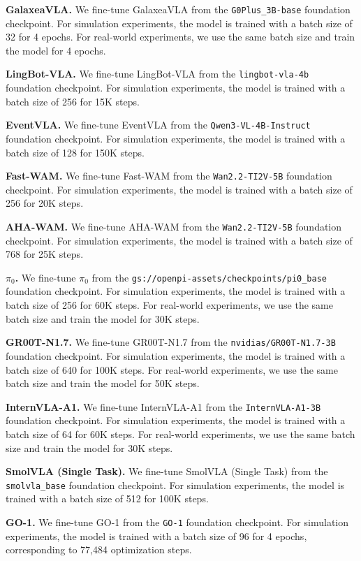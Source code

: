 \textbf{GalaxeaVLA.}
We fine-tune GalaxeaVLA from the \texttt{G0Plus\_3B-base} foundation checkpoint.
For simulation experiments, the model is trained with a batch size of 32 for 4 epochs.
For real-world experiments, we use the same batch size and train the model for 4 epochs.

\textbf{LingBot-VLA.}
We fine-tune LingBot-VLA from the \texttt{lingbot-vla-4b} foundation checkpoint.
For simulation experiments, the model is trained with a batch size of 256 for 15K steps.

\textbf{EventVLA.}
We fine-tune EventVLA from the \texttt{Qwen3-VL-4B-Instruct} foundation checkpoint.
For simulation experiments, the model is trained with a batch size of 128 for 150K steps.

\textbf{Fast-WAM.}
We fine-tune Fast-WAM from the \texttt{Wan2.2-TI2V-5B} foundation checkpoint.
For simulation experiments, the model is trained with a batch size of 256 for 20K steps.

\textbf{AHA-WAM.}
We fine-tune AHA-WAM from the \texttt{Wan2.2-TI2V-5B} foundation checkpoint.
For simulation experiments, the model is trained with a batch size of 768 for 25K steps.

\textbf{$\pi_0$.}
We fine-tune $\pi_0$ from the \texttt{gs://openpi-assets/checkpoints/pi0\_base} foundation checkpoint.
For simulation experiments, the model is trained with a batch size of 256 for 60K steps.
For real-world experiments, we use the same batch size and train the model for 30K steps.

\textbf{GR00T-N1.7.}
We fine-tune GR00T-N1.7 from the \texttt{nvidias/GR00T-N1.7-3B} foundation checkpoint.
For simulation experiments, the model is trained with a batch size of 640 for 100K steps.
For real-world experiments, we use the same batch size and train the model for 50K steps.

\textbf{InternVLA-A1.}
We fine-tune InternVLA-A1 from the \texttt{InternVLA-A1-3B} foundation checkpoint.
For simulation experiments, the model is trained with a batch size of 64 for 60K steps.
For real-world experiments, we use the same batch size and train the model for 30K steps.

\textbf{SmolVLA (Single Task).}
We fine-tune SmolVLA (Single Task) from the \texttt{smolvla\_base} foundation checkpoint.
For simulation experiments, the model is trained with a batch size of 512 for 100K steps.

\textbf{GO-1.}
We fine-tune GO-1 from the \texttt{GO-1} foundation checkpoint.
For simulation experiments, the model is trained with a batch size of 96 for 4 epochs, corresponding to 77,484 optimization steps.

